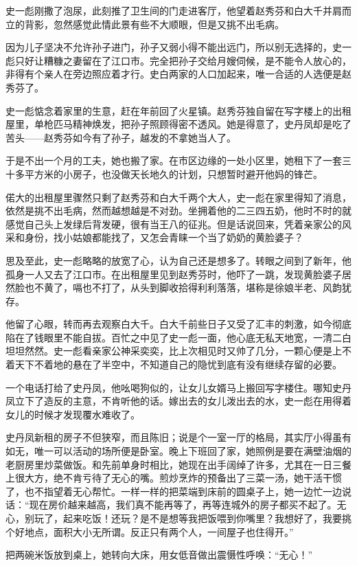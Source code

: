 史一彪刚撒了泡尿，此刻推了卫生间的门走进客厅，他望着赵秀芬和白大千并肩而立的背影，忽然感觉此情此景有些不大顺眼，但是又挑不出毛病。

因为儿子坚决不允许孙子进门，孙子又弱小得不能出远门，所以别无选择的，史一彪只好让糟糠之妻留在了江口市。完全把孙子交给月嫂伺候，是不能令人放心的，非得有个亲人在旁边照应着才行。史白两家的人口加起来，唯一合适的人选便是赵秀芬了。

史一彪惦念着家里的生意，赶在年前回了火星镇。赵秀芬独自留在写字楼上的出租屋里，单枪匹马精神焕发，把孙子照顾得密不透风。她是得意了，史丹凤却是吃了苦头——赵秀芬如今有了孙子，越发的不拿她当人了。

于是不出一个月的工夫，她也搬了家。在市区边缘的一处小区里，她租下了一套三十多平方米的小房子，也没做天长地久的计划，只想暂时避开他妈的锋芒。

偌大的出租屋里骤然只剩了赵秀芬和白大千两个大人，史一彪在家里得知了消息，依然是挑不出毛病，然而越想越是不对劲。坐拥着他的二三四五奶，他时不时的就感觉自己头上发绿后背发硬，很有当王八的征兆。但是话说回来，凭着亲家公的风采和身份，找小姑娘都能找了，又怎会青睐一个当了奶奶的黄脸婆子？

思及至此，史一彪略略的放宽了心，认为自己还是想多了。转眼之间到了新年，他孤身一人又去了江口市。在出租屋里见到赵秀芬时，他吓了一跳，发现黄脸婆子居然脸也不黄了，嗝也不打了，从头到脚收拾得利利落落，堪称是徐娘半老、风韵犹存。

他留了心眼，转而再去观察白大千。白大千前些日子又受了汇丰的刺激，如今彻底陷在了钱眼里不能自拔。百忙之中见了史一彪一面，他心底无私天地宽，一清二白坦坦然然。史一彪看亲家公神采奕奕，比上次相见时又帅了几分，一颗心便是上不着天下不着地的悬在了半空中，不知道自己的隐忧到底有没有继续存留的必要。

一个电话打给了史丹凤，他吆喝狗似的，让女儿女婿马上搬回写字楼住。哪知史丹凤立下了造反的主意，不肯听他的话。嫁出去的女儿泼出去的水，史一彪在用得着女儿的时候才发现覆水难收了。

史丹凤新租的房子不但狭窄，而且陈旧；说是个一室一厅的格局，其实厅小得虽有如无，唯一可以活动的场所便是卧室。晚上下班回了家，她照例是要在满壁油烟的老厨房里炒菜做饭。和先前单身时相比，她现在出手阔绰了许多，尤其在一日三餐上很大方，绝不肯亏待了无心的嘴。煎炒烹炸的预备出了三菜一汤，她干活干惯了，也不指望着无心帮忙。一样一样的把菜端到床前的圆桌子上，她一边忙一边说话：``现在房价越来越高，我们真不能再等了，再等连城外的房子都买不起了。无心，别玩了，起来吃饭！还玩？是不是想等我把饭喂到你嘴里？我想好了，我要挑个好地点，面积大小无所谓。反正只有两个人，一间屋子也住得开。''

把两碗米饭放到桌上，她转向大床，用女低音做出震慑性呼唤：``无心！''

